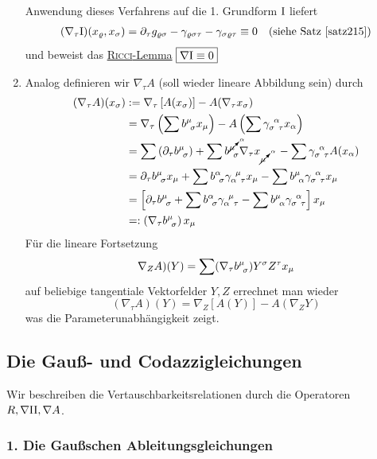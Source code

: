 \begin{enumerate}
 \begin{bemerkung}
  Anwendung dieses Verfahrens auf die 1. Grundform \(\Rom1\) liefert
  \begin{align*}
   &(\nabla_\tau \Rom1) (x_\varrho, x_\sigma) = \partial_\tau g_{\varrho \sigma} - \gamma_{\varrho \sigma \tau} - \gamma_{\sigma \varrho \tau} \equiv 0 &\text{(siehe Satz \ref{satz215})}
  \end{align*}
   und beweist das \uline{\textsc{Ricci}-Lemma} \(\boxed{\nabla \Rom1 \equiv 0}\)
  \end{bemerkung}
 \item Analog definieren wir \(\nabla_\tau A\) (soll wieder lineare Abbildung sein) durch
 \begin{align*}
  (\nabla_\tau A) (x_\sigma) &:= \nabla_\tau \left[A(x_\sigma)\right] - A(\nabla_\tau x_\sigma) \\
  &= \nabla_\tau \left(\sum b^{\mu}_{\;\, \sigma} x_\mu \right) - A\left(\sum \gamma_{\sigma \;\, \tau}^{\;\, \alpha} x_\alpha \right) \\
  &= \sum \left(\partial_\tau b^{\mu}_{\;\, \sigma} \right) + \sum b^{\cancelto{\alpha}{\mu}}_{\;\, \sigma} \nabla_\tau x_{\cancelto{\alpha}{\mu}} \quad- \sum \gamma_{\sigma \;\, \tau}^{\;\, \alpha} A(x_\alpha) \\
  &= \partial_\tau b^{\mu}_{\;\, \sigma} x_\mu + \sum b^{\alpha}_{\;\, \sigma} \gamma_{\alpha \;\, \tau}^{\;\, \mu} x_\mu - \sum b^{\mu}_{\;\, \alpha} \gamma_{\sigma \;\, \tau}^{\;\, \alpha} x_\mu \\
  &= \left[\partial_\tau b^{\mu}_{\;\, \sigma} + \sum b^{\alpha}_{\;\, \sigma} \gamma_{\alpha \;\, \tau}^{\;\, \mu} - \sum b^{\mu}_{\;\, \alpha} \gamma_{\sigma \;\, \tau}^{\;\, \alpha} \right] x_\mu \\
  &=: \left(\nabla_\tau b^{\mu}_{\;\, \sigma} \right) x_\mu
 \end{align*}
 Für die lineare Fortsetzung
 \[
  \nabla_Z A)(Y) = \sum (\nabla_\tau b^{\mu}_{\;\, \sigma}) Y^\sigma Z^\tau x_\mu
 \]
 auf beliebige tangentiale Vektorfelder \(Y,Z\) errechnet man wieder 
 \[
  (\nabla_\tau A) (Y) = \nabla_Z \left[A(Y)\right] - A(\nabla_Z Y)
 \]
 was die Parameterunabhängigkeit zeigt.
\end{enumerate}

\subsection{Die Gauß- und Codazzigleichungen}
Wir beschreiben die Vertauschbarkeitsrelationen durch die Operatoren \(R, \nabla \Rom2, \nabla A\).

\subsubsection{1. Die Gaußschen Ableitungsgleichungen}

